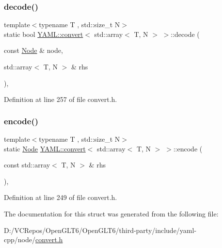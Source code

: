 \subsubsection{\texorpdfstring{decode()}{decode()}}
{\footnotesize\ttfamily template$<$typename T , std\+::size\+\_\+t N$>$ \\
static bool \mbox{\hyperlink{struct_y_a_m_l_1_1convert}{Y\+A\+M\+L\+::convert}}$<$ std\+::array$<$ T, N $>$ $>$\+::decode (\begin{DoxyParamCaption}\item[{const \mbox{\hyperlink{class_y_a_m_l_1_1_node}{Node}} \&}]{node,  }\item[{std\+::array$<$ T, N $>$ \&}]{rhs }\end{DoxyParamCaption})\hspace{0.3cm}{\ttfamily [inline]}, {\ttfamily [static]}}



Definition at line 257 of file convert.\+h.

\mbox{\label{struct_y_a_m_l_1_1convert_3_01std_1_1array_3_01_t_00_01_n_01_4_01_4_ab773bcbd4257b6e7027b4a43d29e1075}} 
\subsubsection{\texorpdfstring{encode()}{encode()}}
{\footnotesize\ttfamily template$<$typename T , std\+::size\+\_\+t N$>$ \\
static \mbox{\hyperlink{class_y_a_m_l_1_1_node}{Node}} \mbox{\hyperlink{struct_y_a_m_l_1_1convert}{Y\+A\+M\+L\+::convert}}$<$ std\+::array$<$ T, N $>$ $>$\+::encode (\begin{DoxyParamCaption}\item[{const std\+::array$<$ T, N $>$ \&}]{rhs }\end{DoxyParamCaption})\hspace{0.3cm}{\ttfamily [inline]}, {\ttfamily [static]}}



Definition at line 249 of file convert.\+h.



The documentation for this struct was generated from the following file\+:\begin{DoxyCompactItemize}
\item 
D\+:/\+V\+C\+Repos/\+Open\+G\+L\+T6/\+Open\+G\+L\+T6/third-\/party/include/yaml-\/cpp/node/\mbox{\hyperlink{convert_8h}{convert.\+h}}\end{DoxyCompactItemize}
